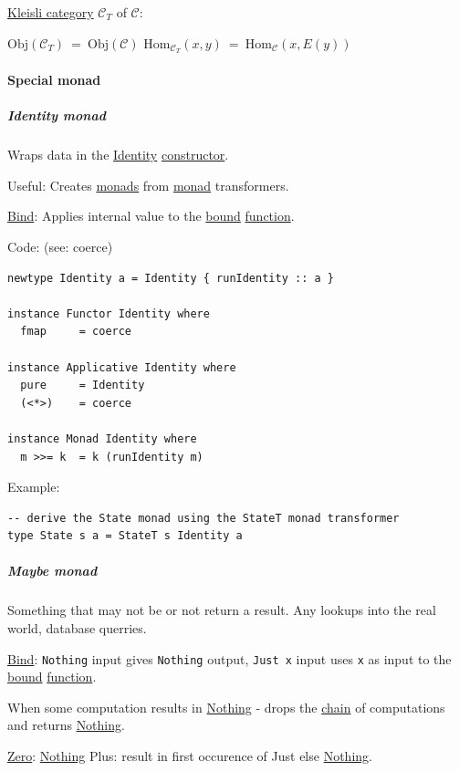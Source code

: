 \documentclass[a4paper,14pt,oneside]{book}
\begin{document}
\hyperref[org1dfabfe]{Kleisli category} \(\mathcal{C}_{T}\) of \(\mathcal{C}\):

\(\mathrm{Obj}(\mathcal{C}_{T}) \ = \ \mathrm{Obj}(\mathcal{C})\)
\(\mathrm{Hom}_{\mathcal{C}_{T}}(x,y) \ = \ \mathrm{Hom}_{\mathcal{C}}(x,E(y))\)

\paragraph{\label{org0f785bb}Special monad}
\label{sec:org858396c}
\subparagraph{\label{org210d0c8}Identity monad}
\label{sec:orgea23fbb}
Wraps data in the \hyperref[org8f74f13]{Identity} \hyperref[org3d55311]{constructor}.

Useful: Creates \hyperref[org0f63ff3]{monads} from \hyperref[orgec3710d]{monad} transformers.

\hyperref[org956f742]{Bind}: Applies internal value to the \hyperref[org42d32e3]{bound} \hyperref[orgf54a964]{function}.

Code: (see: coerce)

\begin{verbatim}
newtype Identity a = Identity { runIdentity :: a }

instance Functor Identity where
  fmap     = coerce

instance Applicative Identity where
  pure     = Identity
  (<*>)    = coerce

instance Monad Identity where
  m >>= k  = k (runIdentity m)
\end{verbatim}

Example:
\begin{verbatim}
-- derive the State monad using the StateT monad transformer
type State s a = StateT s Identity a
\end{verbatim}

\subparagraph{\label{orgb7c4bf8}Maybe monad}
\label{sec:org08782c5}
Something that may not be or not return a result. Any lookups into the real world, database querries.

\hyperref[org956f742]{Bind}: \texttt{Nothing} input gives \texttt{Nothing} output, \texttt{Just x} input uses \texttt{x} as input to the \hyperref[org42d32e3]{bound} \hyperref[orgf54a964]{function}.

When some computation results in \hyperref[org6ec295f]{Nothing} -  drops the \hyperref[org3b5ce40]{chain} of computations and returns \hyperref[org6ec295f]{Nothing}.

\hyperref[orgc363c54]{Zero}: \hyperref[org6ec295f]{Nothing}
Plus: result in first occurence of Just else \hyperref[org6ec295f]{Nothing}.
\end{document}
